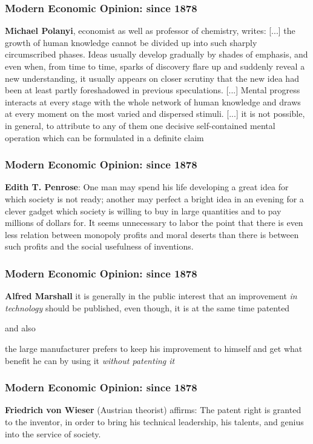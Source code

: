 \begin{frame}
\frametitle{Modern Economic Opinion: since 1878}
\textbf{Michael Polanyi}, economist as well as professor of chemistry, writes:
[...] the growth of human knowledge cannot be divided up into such sharply circumscribed phases. Ideas usually develop gradually by shades of emphasis, and even when, from time to time, sparks of discovery flare up and suddenly reveal a new understanding, it usually appears on closer scrutiny that the new idea had been at least partly foreshadowed in previous speculations.
[...] Mental progress interacts at every stage with the whole network of human knowledge and draws at every moment on the most varied and dispersed stimuli.
[...] it is not possible, in general, to attribute to any of them one decisive self-contained mental operation which can be formulated in a definite claim
\end{frame}

\begin{frame}
\frametitle{Modern Economic Opinion: since 1878}
\textbf{Edith T. Penrose}:
One man may spend his life developing a great idea for which society is not ready; another may perfect a bright idea in an evening for a clever gadget which society is willing to buy in large quantities and to pay millions of dollars for. It seems unnecessary to labor the point that there is even less relation between monopoly profits and moral deserts than there is between such profits and the social usefulness of inventions.
\end{frame}

\begin{frame}
\frametitle{Modern Economic Opinion: since 1878}
\textbf{Alfred Marshall} it is generally in the public interest that an improvement \textit{in technology} should be published, even though, it is at the same time patented 

and also

the large manufacturer prefers to keep his improvement to himself and get what benefit he can by using it \textit{without patenting it}
\end{frame}

\begin{frame}
\frametitle{Modern Economic Opinion: since 1878}
\textbf{Friedrich von Wieser} (Austrian theorist) affirms:
The patent right is granted to the inventor, in order to bring his technical leadership, his talents, and genius into the service of society.
\end{frame}

